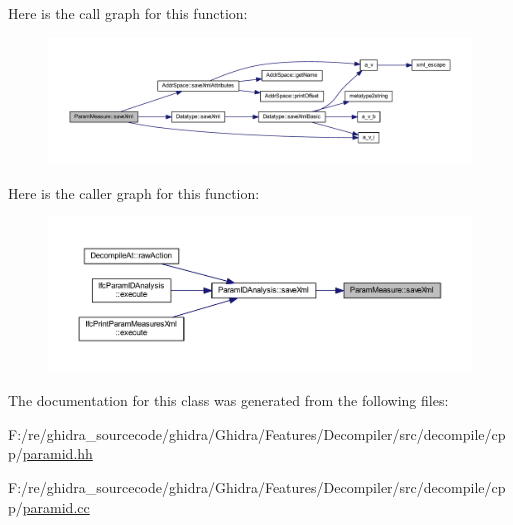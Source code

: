 Here is the call graph for this function\+:
\nopagebreak
\begin{figure}[H]
\begin{center}
\leavevmode
\includegraphics[width=350pt]{class_param_measure_a53d9f454f92708e2e61a60c83222fe7a_cgraph}
\end{center}
\end{figure}
Here is the caller graph for this function\+:
\nopagebreak
\begin{figure}[H]
\begin{center}
\leavevmode
\includegraphics[width=350pt]{class_param_measure_a53d9f454f92708e2e61a60c83222fe7a_icgraph}
\end{center}
\end{figure}


The documentation for this class was generated from the following files\+:\begin{DoxyCompactItemize}
\item 
F\+:/re/ghidra\+\_\+sourcecode/ghidra/\+Ghidra/\+Features/\+Decompiler/src/decompile/cpp/\mbox{\hyperlink{paramid_8hh}{paramid.\+hh}}\item 
F\+:/re/ghidra\+\_\+sourcecode/ghidra/\+Ghidra/\+Features/\+Decompiler/src/decompile/cpp/\mbox{\hyperlink{paramid_8cc}{paramid.\+cc}}\end{DoxyCompactItemize}
